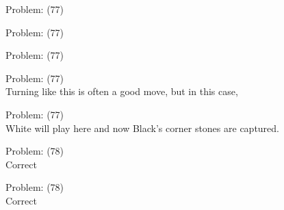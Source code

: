 \documentclass[11pt]{article}
\begin{document}
\begin{minipage}[t]{0.5\textwidth}
  {\centering
  
  Problem: (77)\\
  
  }
\end{minipage}
\begin{minipage}[t]{0.5\textwidth}
  {\centering
  
  Problem: (77)\\
  
  }
\end{minipage}
\begin{minipage}[t]{0.5\textwidth}
  {\centering
  
  Problem: (77)\\
  
  }
\end{minipage}
\begin{minipage}[t]{0.5\textwidth}
  {\centering
  
  Problem: (77)\\
  Turning like this is often a good move, but in this case,\\
  }
\end{minipage}
\begin{minipage}[t]{0.5\textwidth}
  {\centering
  
  Problem: (77)\\
  White will play here and now Black's corner stones are captured.\\
  }
\end{minipage}
\begin{minipage}[t]{0.5\textwidth}
  {\centering
  
  Problem: (78)\\
  Correct\\
  }
\end{minipage}
\begin{minipage}[t]{0.5\textwidth}
  {\centering
  
  Problem: (78)\\
  Correct\\
  }
\end{minipage}
\end{document}
